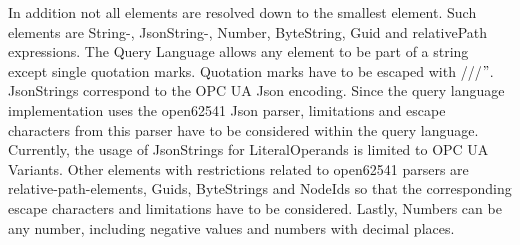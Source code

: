 \documentclass[10pt]{scrreprt}
\begin{document}
In addition not all elements are resolved down to the smallest element. Such elements are String-, JsonString-, Number, ByteString, Guid and relativePath expressions. The Query Language allows any element to be part of a string except
single quotation marks. Quotation marks have to be escaped with ///\("\). JsonStrings correspond to the OPC UA Json encoding. Since the query language implementation uses the open62541 Json parser, limitations and escape characters from this parser have to be
considered within the query language. Currently, the usage of JsonStrings for LiteralOperands is limited to OPC UA Variants. Other elements with restrictions related to open62541 parsers are relative-path-elements,
Guids, ByteStrings and NodeIds so that the corresponding escape characters and limitations have to be considered. Lastly, Numbers can be any number, including negative values and numbers with decimal places.
\end{document}
